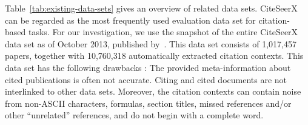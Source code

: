 Table~\ref{tab:existing-data-sets} gives an overview of related data sets.
CiteSeerX can be regarded as the most frequently used evaluation data set for citation-based tasks.
For our investigation, we use the snapshot of the entire CiteSeerX data set as of October 2013, published by~\cite{Huang2015fixed}. This data set consists of 1,017,457 papers, together with 10,760,318 automatically extracted citation contexts.
This data set has the following drawbacks \cite{Roy2016fixed,Faerber2018LREC}: The provided meta-information about cited publications is often not accurate. Citing and cited documents are not interlinked to other data sets. Moreover, the citation contexts can contain noise from non-ASCII characters, formulas, section titles, missed references and/or other ``unrelated'' references, and do not begin with a complete word.

